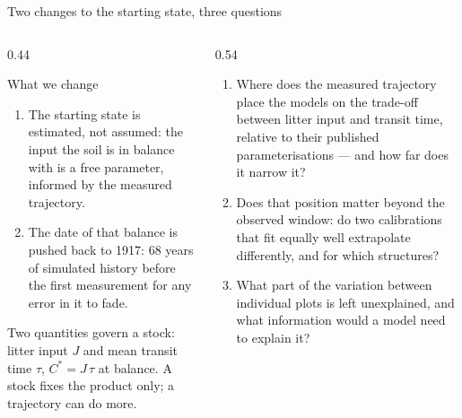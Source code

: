 \documentclass[aspectratio=169,11pt]{beamer}
\begin{document}
\begin{frame}{Two changes to the starting state, three questions}
  \small
  \begin{columns}[T]
    \begin{column}{0.44\textwidth}
      \begin{block}{What we change}
        \begin{enumerate}
          \item The starting state is \alert{estimated}, not assumed: the input the soil is in balance with is a free parameter, informed by the measured trajectory.
          \item The date of that balance is \alert{pushed back to 1917}: 68 years of simulated history before the first measurement for any error in it to fade.
        \end{enumerate}
      \end{block}
      \vspace{0.3em}
      \footnotesize Two quantities govern a stock: litter input $J$ and mean transit time $\tau$, $C^{*} = J\,\tau$ at balance. A stock fixes the product only; a trajectory can do more.
    \end{column}
    \begin{column}{0.54\textwidth}
      \begin{enumerate}
        \item[\textbf{I}] Where does the measured trajectory place the models on the \alert{trade-off between litter input and transit time}, relative to their published parameterisations --- and how far does it narrow it?
        \item[\textbf{II}] Does that position matter \alert{beyond the observed window}: do two calibrations that fit equally well extrapolate differently, and for which structures?
        \item[\textbf{III}] What part of the variation between \alert{individual plots} is left unexplained, and what information would a model need to explain it?
      \end{enumerate}
    \end{column}
  \end{columns}
\end{frame}
\end{document}
